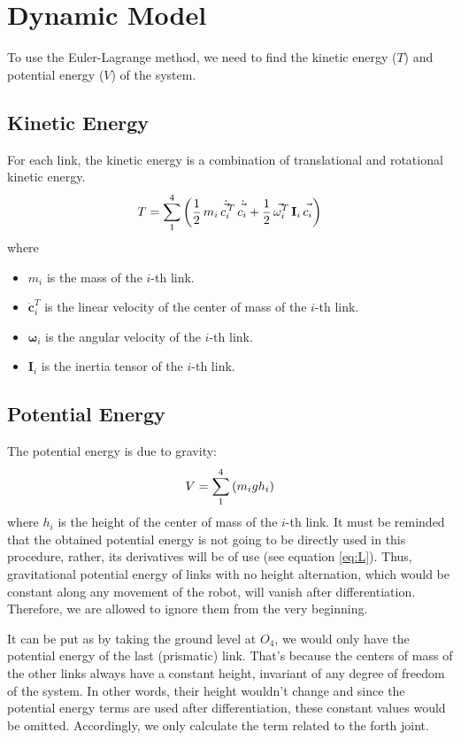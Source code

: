 \documentclass[conference]{IEEEtran}
\begin{document}
\section{Dynamic Model}
To use the Euler-Lagrange method, we need to find the kinetic energy ($T$) and potential energy ($V$) of the system.

\subsection{Kinetic Energy}
For each link, the kinetic energy is a combination of translational and rotational kinetic energy.
\begin{equation} \Large
    T = \sum_{1}^{4} \left(\frac{1}{2} \, m_i \, \dot{\vec{c}}_i^{\,T} \, \dot{\vec{c}}_i + \frac{1}{2} \, \vec{\omega}_i^T \, \mathbf{I}_i \, \vec{c}_i\right)
\end{equation}
where
\begin{itemize}
    \item $m_i$ is the mass of the $i$-th link.
    \item $\dot{\mathbf{c}}_i^{T}$ is the linear velocity of the center of mass of the $i$-th link.
    \item $\boldsymbol{\omega}_i$ is the angular velocity of the $i$-th link.
    \item $\mathbf{I}_i$ is the inertia tensor of the $i$-th link.
\end{itemize}


\subsection{Potential Energy}
The potential energy is due to gravity:
\begin{equation} \Large
    V = \sum_{1}^{4} \left(m_i g h_i\right)
\end{equation}
where $h_i$ is the height of the center of mass of the $i$-th link. It must be reminded that the obtained potential energy is not going to be directly used in this procedure, rather, its derivatives will be of use (see equation \ref{eq:L}). Thus, gravitational potential energy of links with no height alternation, which would be constant along any movement of the robot, will vanish after differentiation. Therefore, we are allowed to ignore them from the very beginning.

It can be put as by taking the ground level at $O_4$, we would only have the potential energy of the last (prismatic) link. That's because the centers of mass of the other links always have a constant height, invariant of any degree of freedom of the system. In other words, their height wouldn't change and since the potential energy terms are
used after differentiation, these constant values would be omitted. Accordingly, we only calculate the term related to the forth joint.
\end{document}
